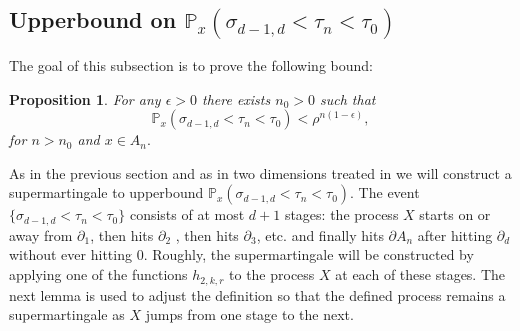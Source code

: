 \documentclass[11pt,a4paper]{article}
\newtheorem{proposition}{Proposition}[section]
\begin{document}
\subsection{Upperbound on ${\mathbb P}_x(\sigma_{d-1,d} < \tau_n < \tau_0)$}\label{ss:sigmad1d}
The goal of this subsection is to prove the following bound:
\begin{proposition}\label{p:upperboundonlong}
For any $\epsilon > 0$ there exists $n_0 > 0$ such that
\[
{\mathbb P}_{x}(\sigma_{d-1,d} < \tau_n < \tau_0) < \rho^{n(1-\epsilon)},
\]
for $n > n_0$ and $x \in A_n.$
\end{proposition}


As in the previous section and as in two dimensions treated in
\cite{sezer2018approximation} we will construct a supermartingale
to upperbound 
${\mathbb P}_x(\sigma_{d-1,d} < \tau_n < \tau_0)$. The event
$\{\sigma_{d-1,d} < \tau_n < \tau_0\}$ consists of at most $d+1$ stages: 
the process $X$ starts on or away from $\partial_1$, then hits $\partial_2$
, then hits $\partial_3$, etc. and finally hits $\partial A_n$ after hitting
$\partial_d$ without ever hitting $0$. Roughly, 
the supermartingale will be constructed
by applying one of the functions $h_{2,k,r}$ to the process $X$ at
each of these stages. The next lemma is used to adjust the definition
so that the defined process remains a supermartingale as $X$ jumps from one
stage to the next.
\end{document}

